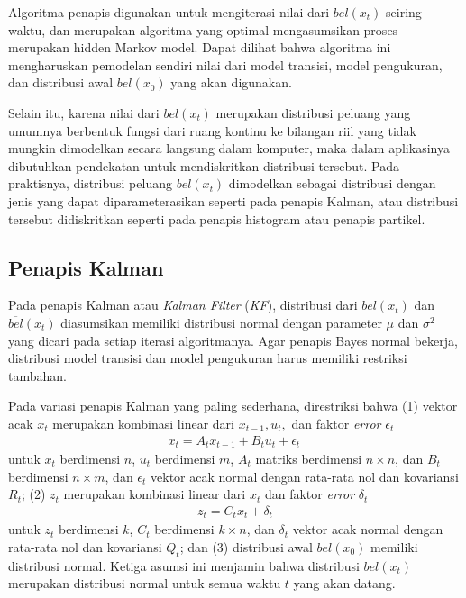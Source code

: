 Algoritma penapis digunakan untuk mengiterasi nilai dari $bel(x_t)$ seiring waktu, dan merupakan algoritma yang optimal mengasumsikan proses merupakan hidden Markov model. Dapat dilihat bahwa algoritma ini mengharuskan pemodelan sendiri nilai dari model transisi, model pengukuran, dan distribusi awal $bel(x_0)$ yang akan digunakan.

Selain itu, karena nilai dari $bel(x_t)$ merupakan distribusi peluang yang umumnya berbentuk fungsi dari ruang kontinu ke bilangan riil yang tidak mungkin dimodelkan secara langsung dalam komputer, maka dalam aplikasinya dibutuhkan pendekatan untuk mendiskritkan distribusi tersebut. Pada praktisnya, distribusi peluang $bel(x_t)$ dimodelkan sebagai distribusi dengan jenis yang dapat diparameterasikan seperti pada penapis Kalman, atau distribusi tersebut didiskritkan seperti pada penapis histogram atau penapis partikel.

\subsection{Penapis Kalman}

Pada penapis Kalman atau \textit{Kalman Filter} (\textit{KF}), distribusi dari $bel(x_t)$ dan $\overline{bel}(x_t)$ diasumsikan memiliki distribusi normal dengan parameter $\mu$ dan $\sigma^2$ yang dicari pada setiap iterasi algoritmanya. Agar penapis Bayes normal bekerja, distribusi model transisi dan model pengukuran harus memiliki restriksi tambahan.

Pada variasi penapis Kalman yang paling sederhana, direstriksi bahwa (1) vektor acak $x_t$ merupakan kombinasi linear dari $x_{t-1}, u_t,$ dan faktor \textit{error} $\epsilon_t$
\begin{align}
    x_t = A_t x_{t-1} + B_t u_t + \epsilon_t \,
\end{align}
untuk $x_t$ berdimensi $n$, $u_t$ berdimensi $m$, $A_t$ matriks berdimensi $n \times n$, dan $B_t$ berdimensi $n \times m$, dan $\epsilon_t$ vektor acak normal dengan rata-rata nol dan kovariansi $R_t$; (2) $z_t$ merupakan kombinasi linear dari $x_t$ dan faktor \textit{error} $\delta_t$
\begin{align}
    z_t = C_t x_t + \delta_t
\end{align}
untuk $z_t$ berdimensi $k$, $C_t$ berdimensi $k \times n$, dan $\delta_t$ vektor acak normal dengan rata-rata nol dan kovariansi $Q_t$; dan (3) distribusi awal $bel(x_0)$ memiliki distribusi normal. Ketiga asumsi ini menjamin bahwa distribusi $bel(x_t)$ merupakan distribusi normal untuk semua waktu $t$ yang akan datang.

